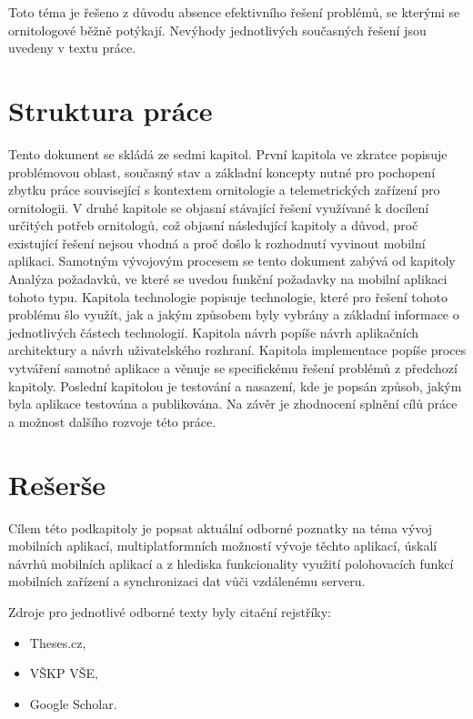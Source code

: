 Toto téma je řešeno z důvodu absence efektivního řešení problémů, se kterými se ornitologové běžně potýkají. Nevýhody jednotlivých současných řešení jsou uvedeny v textu práce.

\section*{Struktura práce}
Tento dokument se skládá ze sedmi kapitol. První kapitola ve zkratce popisuje problémovou oblast, současný stav a základní koncepty nutné pro pochopení zbytku práce související s kontextem ornitologie a telemetrických zařízení pro ornitologii. V druhé kapitole se objasní stávající řešení využívané k docílení určitých potřeb ornitologů, což objasní následující kapitoly a důvod, proč existující řešení nejsou vhodná a proč došlo k rozhodnutí vyvinout mobilní aplikaci. Samotným vývojovým procesem se tento dokument zabývá od kapitoly Analýza požadavků, ve které se uvedou funkční požadavky na mobilní aplikaci tohoto typu. Kapitola technologie popisuje technologie, které pro řešení tohoto problému šlo využít, jak a jakým způsobem byly vybrány a základní informace o jednotlivých částech technologií. Kapitola návrh popíše návrh aplikačních architektury a návrh uživatelského rozhraní. Kapitola implementace popíše proces vytváření samotné aplikace a věnuje se specifickému řešení problémů z předchozí kapitoly. Poslední kapitolou je testování a nasazení, kde je popsán způsob, jakým byla aplikace testována a publikována. Na závěr je zhodnocení splnění cílů práce a možnost dalšího rozvoje této práce.

\section*{Rešerše}

Cílem této podkapitoly je popsat aktuální odborné poznatky na téma vývoj mobilních aplikací, multiplatformních možností vývoje těchto aplikací, úskalí návrhů mobilních aplikací a z hlediska funkcionality využití polohovacích funkcí mobilních zařízení a synchronizaci dat vůči vzdálenému serveru.

Zdroje pro jednotlivé odborné texty byly citační rejstříky:

\begin{itemize}
	\item Theses.cz,
	\item VŠKP VŠE,
	\item Google Scholar.
\end{itemize}


